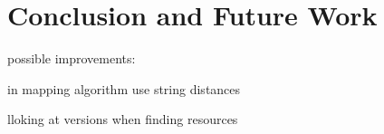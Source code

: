 \chapter{Conclusion and Future Work}
\label{chap7-conclusion-and-future-work}
\thispagestyle{empty}

possible improvements:

in mapping algorithm use string distances

lloking at versions when finding resources




